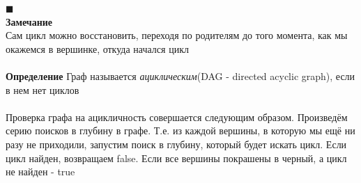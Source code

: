 $\blacksquare$\\
\textbf{Замечание}\\ Сам цикл можно восстановить, переходя по родителям до того момента, как мы окажемся в вершинке, откуда начался цикл \\
\\
\textbf{Определение} Граф называется \textit{ациклическим}(DAG - directed acyclic graph), если в нем нет циклов
\\
\\ 
Проверка графа на ацикличность совершается следующим образом. Произведём серию поисков в глубину в графе. Т.е. из каждой вершины, в которую мы ещё ни разу не приходили, запустим поиск в глубину, который будет искать цикл. Если цикл найден, возвращаем false. Если все вершины покрашены в черный, а цикл не найден - true
